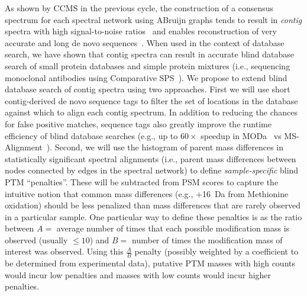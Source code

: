 \documentclass[arial,11pt]{article}
\begin{document}
As shown by CCMS in the previous cycle, the construction of a consensus spectrum for each spectral network using ABruijn graphs tends to result in {\em contig} spectra with high signal-to-noise ratios~\cite{bandeira07pnas,bandeira07mcp,guthals12specnets} and enables reconstruction of very accurate and long de novo sequences~\cite{guthals12metasps}. When used in the context of database search, we have shown that contig spectra can result in accurate blind database search of small protein databases and simple protein mixtures (i.e., sequencing monoclonal antibodies using Comparative SPS~\cite{bandeira08}). We propose to extend blind database search of contig spectra using two approaches. First we will use short contig-derived de novo sequence tags to filter the set of locations in the database against which to align each contig spectrum. In addition to reducing the chances for false positive matches, sequence tags also greatly improve the runtime efficiency of blind database searches (e.g., up to $60\times$ speedup in MODa~\cite{na11} vs MS-Alignment~\cite{tsur05}). Second, we will use the histogram of parent mass differences in statistically significant spectral alignments (i.e., parent mass differences between nodes connected by edges in the spectral network) to define {\em sample-specific} blind PTM ``penalties''. These will be subtracted from PSM scores to capture the intuitive notion that common mass differences (e.g., +16~Da from Methionine oxidation) should be less penalized than mass differences that are rarely observed in a particular sample. One particular way to define these penalties is as the ratio between $A=$ average number of times that each possible modification mass is observed (usually $\leq 10$) and $B=$ number of times the modification mass of interest was observed. Using this $\frac{A}{B}$ penalty (possibly weighted by a coefficient to be determined from experimental data), putative PTM masses with high counts would incur low penalties and masses with low counts would incur higher penalties.
\end{document}
